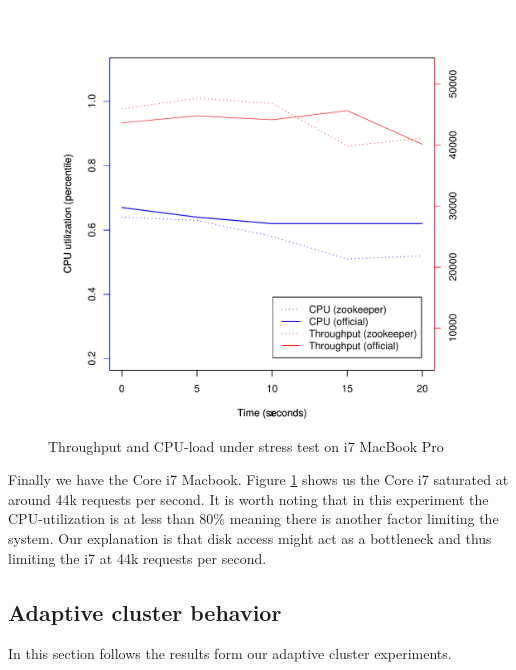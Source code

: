 \begin{figure}[h]
    \centering
    \includegraphics[width=1.0\textwidth]{results/throughput/singlenode/throughput_eivind}
    \caption{Throughput and CPU-load under stress test on i7 MacBook Pro}
    \label{fig:thug_eivind}
\end{figure}

Finally we have the Core i7 Macbook. Figure \ref{fig:thug_eivind} shows us the Core i7 saturated at around 44k requests per second. It is worth noting that in this experiment the CPU-utilization is at less than 80\% meaning there is another factor limiting the system. Our explanation is that disk access might act as a bottleneck and thus limiting the i7 at 44k requests per second.


\clearpage
\subsection{Adaptive cluster behavior}
In this section follows the results form our adaptive cluster experiments.


